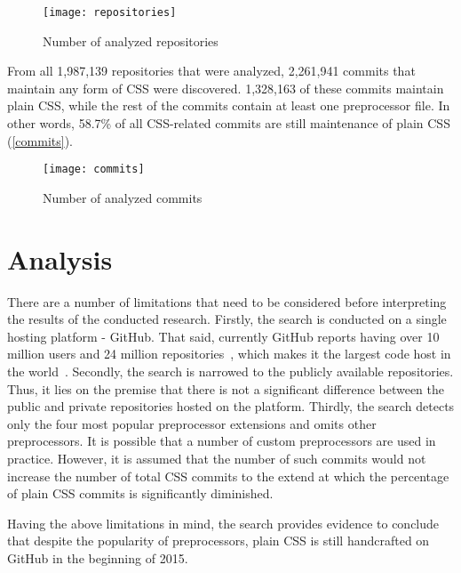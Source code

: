 \begin{figure}[h!]
  \centering
  \caption{
  	\label{repositories}
  	Number of analyzed repositories}
  \texttt{[image: repositories]}
\end{figure}

From all 1,987,139 repositories that were analyzed, 2,261,941 commits that
maintain any form of CSS were discovered. 1,328,163 of these commits maintain
plain CSS, while the rest of the commits contain at least one preprocessor
file. In other words, 58.7\% of all CSS-related commits are still maintenance
of plain CSS (\autoref{commits}).

\begin{figure}[h!]
  \centering
  \caption{
  	\label{commits}
  	Number of analyzed commits}
  \texttt{[image: commits]}
\end{figure}

\section{Analysis}

There are a number of limitations that need to be considered before
interpreting the results of the conducted research. Firstly, the search is
conducted on a single hosting platform - GitHub. That said, currently GitHub
reports having over 10 million users and 24 million
repositories~\cite{GitHub}, which makes it the largest code host in the
world~\cite{gousios2014lean}. Secondly, the search is narrowed to the publicly
available repositories. Thus, it lies on the premise that there is not a
significant difference between the public and private repositories hosted on
the platform. Thirdly, the search detects only the four most popular
preprocessor extensions and omits other preprocessors. It is possible that a
number of custom preprocessors are used in practice. However, it is assumed
that the number of such commits would not increase the number of total CSS
commits to the extend at which the percentage of plain CSS commits is
significantly diminished.

Having the above limitations in mind, the search provides evidence to conclude
that despite the popularity of preprocessors, plain CSS is still handcrafted
on GitHub in the beginning of 2015.

